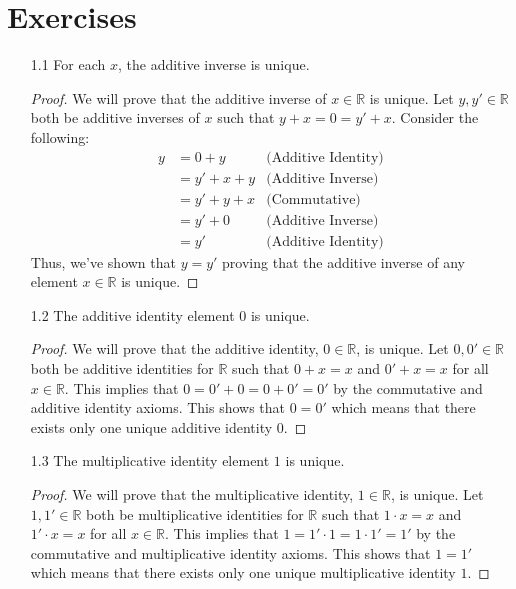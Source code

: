 \documentclass[12pt, letterpaper]{article}
\theoremstyle{plain}
\theoremstyle{definition}
\theoremstyle{remark}
\begin{document}
\section{Exercises} %
\begin{itemize}

\item[1.1] For each $x$, the additive inverse is unique.
\begin{proof}
We will prove that the additive inverse of $x\in\mathbb{R}$ is unique. Let $y,y'\in\mathbb{R}$ both be additive inverses of $x$ such that $y+x=0=y'+x$. Consider the following:
\begin{align*}
    y &= 0+y    &\text{(Additive Identity)} \\
      &= y'+x+y &\text{(Additive Inverse)} \\
      &= y'+y+x &\text{(Commutative)} \\
      &= y'+0   &\text{(Additive Inverse)} \\
      &= y'     &\text{(Additive Identity)}
\end{align*}
Thus, we've shown that $y=y'$ proving that the additive inverse of any element $x\in\mathbb{R}$ is unique.
\end{proof}

\item[1.2] The additive identity element $0$ is unique.
\begin{proof}
We will prove that the additive identity, $0\in\mathbb{R}$, is unique. Let $0,0'\in\mathbb{R}$ both be additive identities for $\mathbb{R}$ such that $0+x=x$ and $0'+x=x$ for all $x\in\mathbb{R}$. This implies that $0=0'+0=0+0'=0'$ by the commutative and additive identity axioms. This shows that $0=0'$ which means that there exists only one unique additive identity $0$.
\end{proof}

\item[1.3] The multiplicative identity element $1$ is unique.
\begin{proof}
We will prove that the multiplicative identity, $1\in\mathbb{R}$, is unique. Let $1,1'\in\mathbb{R}$ both be multiplicative identities for $\mathbb{R}$ such that $1\cdot x=x$ and $1'\cdot x=x$ for all $x\in\mathbb{R}$. This implies that $1=1'\cdot 1=1\cdot 1'=1'$ by the commutative and multiplicative identity axioms. This shows that $1=1'$ which means that there exists only one unique multiplicative identity $1$.
\end{proof}


\end{itemize}
\end{document}
